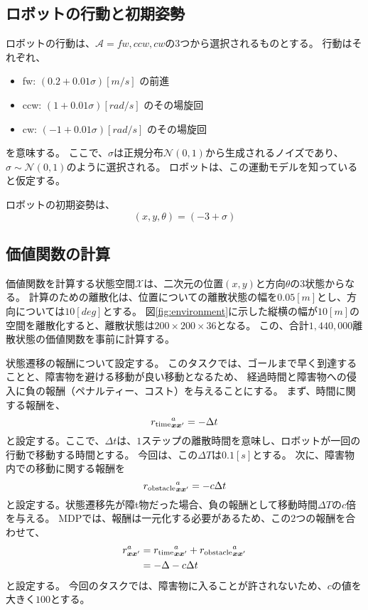 \subsection{ロボットの行動と初期姿勢}
ロボットの行動は、$\mathcal{A} = { fw, ccw, cw }$の3つから選択されるものとする。
行動はそれぞれ、
\begin{itemize}
  \item fw: $(0.2 + 0.01\sigma) \si{[m/s]}$ の前進
  \item ccw: $(1 + 0.01\sigma) \si{[rad/s]}$ のその場旋回
  \item cw: $(-1 + 0.01\sigma) \si{[rad/s]}$ のその場旋回
\end{itemize}
を意味する。
ここで、$\sigma$は正規分布$\mathcal{N}(0, 1)$から生成されるノイズであり、$\sigma \sim \mathcal{{N}}(0, 1)$のように選択される。
ロボットは、この運動モデルを知っていると仮定する。

ロボットの初期姿勢は、
\begin{equation}
\label{robot initial pose}
  (x, y, \theta) = (-3 + \sigma )
\end{equation}

\subsection{価値関数の計算}
価値関数を計算する状態空間$\mathcal{X}$は、二次元の位置$(x, y)$と方向$\theta$の3状態からなる。
計算のための離散化は、位置についての離散状態の幅を$0.05\si{[m]}$とし、方向については$10\si{[deg]}$とする。
図\ref{fig:environment}に示した縦横の幅が$10\si{[m]}$の空間を離散化すると、離散状態は$200 \times 200 \times 36$となる。
この、合計$1,440,000$離散状態の価値関数を事前に計算する。

状態遷移の報酬について設定する。
このタスクでは、ゴールまで早く到達することと、障害物を避ける移動が良い移動となるため、
経過時間と障害物への侵入に負の報酬（ペナルティー、コスト）を与えることにする。
まず、時間に関する報酬を、
\begin{equation}
\label{robot initial pose}
  {r_{\rm time}}^{a}_{\bm{x}\bm{x}^{\prime}} = -\Delta t
\end{equation}
と設定する。ここで、$\Delta t$は、$1$ステップの離散時間を意味し、ロボットが一回の行動で移動する時間とする。
今回は、この$\Delta T$は$0.1[s]$とする。
次に、障害物内での移動に関する報酬を
\begin{equation}
\label{robot initial pose}
  {r_{\rm obstacle}}^{a}_{\bm{x}\bm{x}^{\prime}} = -c\Delta t
\end{equation}
と設定する。状態遷移先が障t物だった場合、負の報酬として移動時間$\Delta T$の$c$倍を与える。
MDPでは、報酬は一元化する必要があるため、この2つの報酬を合わせて、
\begin{equation}
\label{robot initial pose}
\begin{split}
  r^{a}_{\bm{x}\bm{x}^{\prime}} &=
  {r_{\rm time}}^{a}_{\bm{x}\bm{x}^{\prime}} +
  {r_{\rm obstacle}}^{a}_{\bm{x}\bm{x}^{\prime}} \\
  &= -\Delta  -c\Delta t
\end{split}
\end{equation}
と設定する。
今回のタスクでは、障害物に入ることが許されないため、$c$の値を大きく$100$とする。


